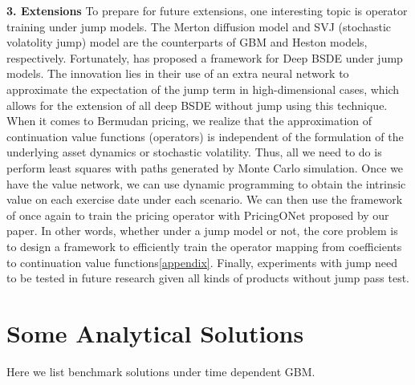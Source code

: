 \documentclass[11pt,a4paper]{article}
\theoremstyle{remark}
\begin{document}
	\noindent \textbf{3. Extensions}
	To prepare for future extensions, one interesting topic is operator training under jump models. The Merton diffusion model and SVJ (stochastic volatolity jump) model are the counterparts of GBM and Heston models, respectively. Fortunately, \cite{gnoatto2023deep} has proposed a framework for Deep BSDE under jump models. The innovation lies in their use of an extra neural network to approximate the expectation of the jump term in high-dimensional cases, which allows for the extension of all deep BSDE without jump using this technique. When it comes to Bermudan pricing, we realize that the approximation of continuation value functions (operators) is independent of the formulation of the underlying asset dynamics or stochastic volatility. Thus, all we need to do is perform least squares with paths generated by Monte Carlo simulation. Once we have the value network, we can use dynamic programming to obtain the intrinsic value on each exercise date under each scenario. We can then use the framework of \cite{gnoatto2023deep} once again to train the pricing operator with PricingONet proposed by our paper. In other words, whether under a jump model or not, the core problem is to design a framework to efficiently train the operator mapping from coefficients to continuation value functions\ref{appendix}. Finally, experiments with jump need to be tested in future research given all kinds of products without jump pass test.
	
	
	
	
	
	\appendix \label{appendix}
	\section{Some Analytical Solutions}
	Here we list benchmark solutions under time dependent GBM.
	\iffalse
\end{document}
